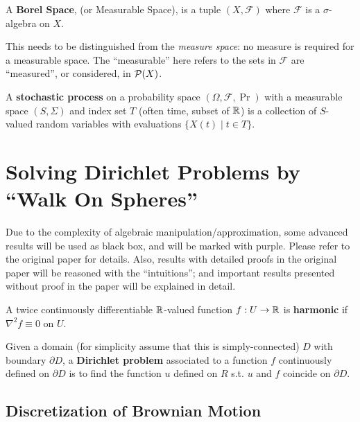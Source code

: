 \documentclass[10pt]{article}
\begin{document}
\begin{definition}
    A \textbf{Borel Space}, (or Measurable Space), is a tuple $(X, \mathcal{F})$ where $\mathcal{F}$ is a $\sigma$-algebra on $X$.
\end{definition}
\nogap
\begin{remark}
    This needs to be distinguished from the \emph{measure space}: no measure is required for a measurable space. The ``measurable'' here refers to the sets in $\mathcal{F}$ are ``measured'', or considered, in $\P(X)$.
\end{remark}

\begin{definition}
    A \textbf{stochastic process} on a probability space $(\Omega, \mathcal{F}, \Pr)$ with a measurable space $(S, \Sigma)$ and index set $T$ (often time, subset of $\R$) is a collection of $S$-valued random variables with evaluations $\{ X(t) \mid t \in T \}$.
\end{definition}

\section{Solving Dirichlet Problems by ``Walk On Spheres'' \cite{WalkOnSphere}}

Due to the complexity of algebraic manipulation/approximation, some advanced results will be used as black box, and will be marked with {\color{darkpurple} purple}. Please refer to the original paper for details. Also, results with detailed proofs in the original paper will be reasoned with the ``intuitions''; and important results presented without proof in the paper will be explained in detail. 

\begin{definition}
    A twice continuously differentiable $\R$-valued function $f: U \to \R$ is \textbf{harmonic} if $\nabla^2 f \equiv 0$ on $U$.
\end{definition}
\nogap
\begin{definition}
    Given a domain (for simplicity assume that this is simply-connected) $D$ with boundary $\partial D$, a \textbf{Dirichlet problem} associated to a function $f$ continuously defined on $\partial D$ is to find the function $u$ defined on $R$ s.t. $u$ and $f$ coincide on $\partial D$.
\end{definition}

\subsection{Discretization of Brownian Motion}
\end{document}
